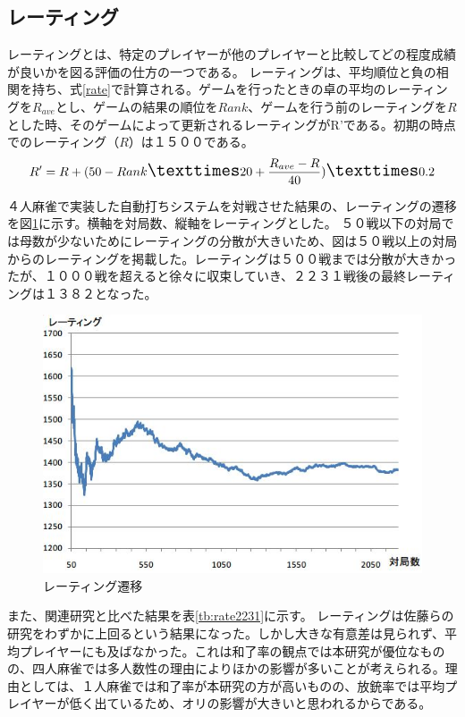 \subsection{レーティング}
レーティングとは、特定のプレイヤーが他のプレイヤーと比較してどの程度成績が良いかを図る評価の仕方の一つである。
レーティングは、平均順位と負の相関を持ち、式\ref{rate}で計算される。ゲームを行ったときの卓の平均のレーティングを$R_{ave}$とし、ゲームの結果の順位を$Rank$、ゲームを行う前のレーティングを$R$とした時、そのゲームによって更新されるレーティングがR'である。初期の時点でのレーティング（$R$）は１５００である。
\begin{equation}
\label{rate}
\Large R' = R + (50 - Rank × 20 + \displaystyle \frac{R_{ave} - R}{40} ) × 0.2
\end{equation}

４人麻雀で実装した自動打ちシステムを対戦させた結果の、レーティングの遷移を図\ref{rate2231}に示す。横軸を対局数、縦軸をレーティングとした。
５０戦以下の対局では母数が少ないためにレーティングの分散が大きいため、図は５０戦以上の対局からのレーティングを掲載した。レーティングは５００戦までは分散が大きかったが、１０００戦を超えると徐々に収束していき、２２３１戦後の最終レーティングは１３８２となった。

\begin{figure}[h]
 \centering
 \includegraphics[keepaspectratio, scale=0.8,bb=0 0 546 372]
      {img/rate2231.jpg}
 \caption{レーティング遷移}
 \label{rate2231}
\end{figure}

また、関連研究と比べた結果を表\ref{tb:rate2231}に示す。
レーティングは佐藤らの研究をわずかに上回るという結果になった。しかし大きな有意差は見られず、平均プレイヤーにも及ばなかった。これは和了率の観点では本研究が優位なものの、四人麻雀では多人数性の理由によりほかの影響が多いことが考えられる。理由としては、１人麻雀では和了率が本研究の方が高いものの、放銃率では平均プレイヤーが低く出ているため、オリの影響が大きいと思われるからである。


